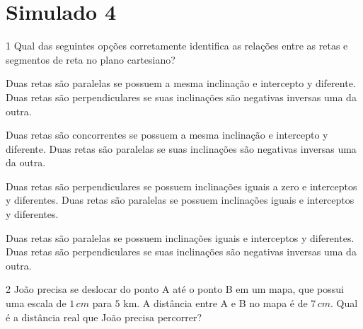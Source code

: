 \section*{Simulado 4}

\num{1}  Qual das seguintes opções corretamente identifica as relações entre
as retas e segmentos de reta no plano cartesiano?

\begin{escolha}
\item Duas retas são paralelas se possuem a mesma inclinação e intercepto y
diferente. Duas retas são perpendiculares se suas inclinações são
negativas inversas uma da outra.
\item Duas retas são concorrentes se possuem a mesma inclinação e
intercepto y diferente. Duas retas são paralelas se suas inclinações são
negativas inversas uma da outra.
\item Duas retas são perpendiculares se possuem inclinações iguais a zero e
interceptos y diferentes. Duas retas são paralelas se possuem
inclinações iguais e interceptos y diferentes.
\item Duas retas são paralelas se possuem inclinações iguais e interceptos
y diferentes. Duas retas são perpendiculares se suas inclinações são
negativas inversas uma da outra.
\end{escolha}



\num{2}  João precisa se deslocar do ponto A até o ponto B em um mapa, que
possui uma escala de $1\,cm$ para $5$ km. A distância entre A e B no mapa é
de $7\,cm$. Qual é a distância real que João precisa percorrer?

